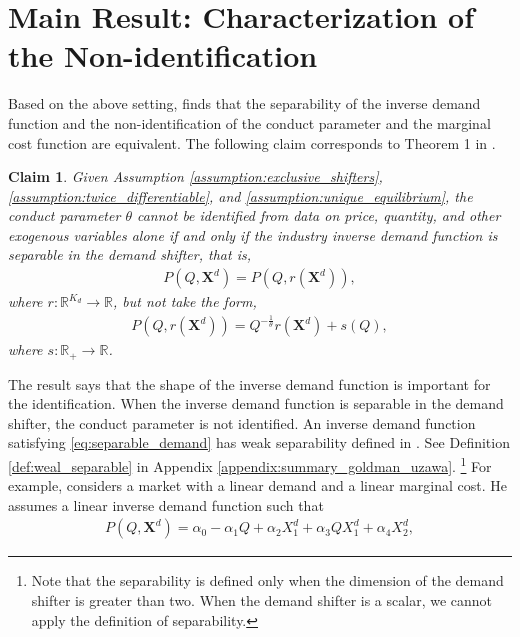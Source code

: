 \documentclass[11pt, a4paper]{article}
\newtheorem{claim}{Claim}
\begin{document}
\section{Main Result: Characterization of the Non-identification}\label{sec:main_result_and_lau_result}

Based on the above setting, \citet{lauIdentifying1982} finds that the separability of the inverse demand function and the non-identification of the conduct parameter and the marginal cost function are equivalent.
The following claim corresponds to Theorem 1 in \citet{lauIdentifying1982}.
\begin{claim}\label{theorem_lau}
    Given Assumption \ref{assumption:exclusive_shifters}, \ref{assumption:twice_differentiable}, and \ref{assumption:unique_equilibrium}, the conduct parameter $\theta$ cannot be identified from data on price, quantity, and other exogenous variables alone if and only if the industry inverse demand function is separable in the demand shifter, that is,
    \begin{align}
        P(Q,\bm{X}^{d}) = P(Q, r(\bm{X}^{d})), \label{eq:separable_demand}
    \end{align}
    where $r:\mathbb{R}^{K_{d}}\rightarrow\mathbb{R}$,
    but not take the form, 
    \begin{align}
        P(Q, r(\bm{X}^{d})) = Q^{-\frac{1}{\theta}}r(\bm{X}^{d}) + s(Q), \label{eq:identification_separable_demand_lau}
    \end{align}
    where $s:\mathbb{R}_{+}\rightarrow \mathbb{R}$.
\end{claim}
The result says that the shape of the inverse demand function is important for the identification.
When the inverse demand function is separable in the demand shifter, the conduct parameter is not identified.
An inverse demand function satisfying \eqref{eq:separable_demand} has weak separability defined in \citet{goldmanNote1964}. See Definition \ref{def:weal_separable} in Appendix \ref{appendix:summary_goldman_uzawa}. \footnote{Note that the separability is defined only when the dimension of the demand shifter is greater than two. When the demand shifter is a scalar, we cannot apply the definition of separability.}
For example, \citet{bresnahanOligopoly1982} considers a market with a linear demand and a linear marginal cost.
He assumes a linear inverse demand function such that
\begin{align}
    P(Q, \bm{X}^{d}) = \alpha_0 - \alpha_1 Q + \alpha_2X^{d}_1 + \alpha_3QX^{d}_1 + \alpha_4X^{d}_2, \label{eq:demand_bresnahan}
\end{align}
\end{document}
